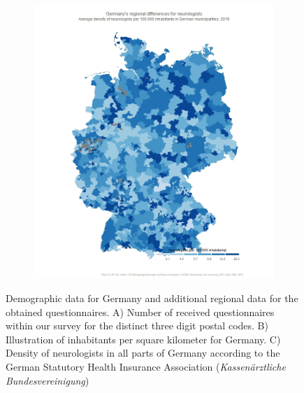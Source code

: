 \documentclass{bmcart}
\begin{document}
\begin{backmatter}
\begin{figure}[!h]
\begin{subfigure}[b]{0.35\linewidth}
\label{fig1:population}
\end{subfigure}%
\begin{subfigure}[b]{0.35\linewidth}
\includegraphics[width=.90\textwidth]{neurologists.10122021.jpeg}
\label{fig1:neurologists}
\end{subfigure}%
\caption{Demographic data for Germany and additional regional data for the obtained questionnaires. A) Number of received questionnaires within our survey for the distinct three digit postal codes. B) Illustration of inhabitants per square kilometer for Germany. C) Density of neurologists in all parts of Germany according to the German Statutory Health Insurance Association (\textit{Kassenärztliche Bundesvereinigung})}
\label{fig1:total}
\end{figure}


\end{backmatter}
\end{document}
